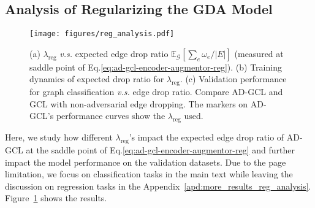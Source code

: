 \vspace{-3mm}
\subsection{Analysis of Regularizing the GDA Model}
\vspace{-2mm}
\label{exp:reg_analysis}

\begin{figure}[t]
    \centering
    \texttt{[image: figures/reg\_analysis.pdf]}
    \caption{\small{(a) $\lambda_{\text{reg}}$ \textit{v.s.} expected edge drop ratio $\mathbb{E}_\mathcal{G}[\sum_{e} \omega_e/|E|]$ (measured at saddle point of Eq.\ref{eq:ad-gcl-encoder-augmentor-reg}). (b) Training dynamics of expected drop ratio for $\lambda_{\text{reg}}$. (c) Validation performance for graph classification \textit{v.s.} edge drop ratio. Compare AD-GCL and GCL with non-adversarial edge dropping. The markers on AD-GCL's performance curves show the $\lambda_{\text{reg}}$ used.}}%
    \label{fig:reg_term_analysis}
    \vspace{-4mm}
\end{figure}

Here, we study how different $\lambda_{\text{reg}}$'s impact the expected edge drop ratio of AD-GCL at the saddle point of Eq.\ref{eq:ad-gcl-encoder-augmentor-reg} and further impact the model performance on the validation datasets. Due to the page limitation, we focus on classification tasks in the main text while leaving the discussion on regression tasks in the Appendix~\ref{apd:more_results_reg_analysis}. Figure~\ref{fig:reg_term_analysis} %
shows the results.

